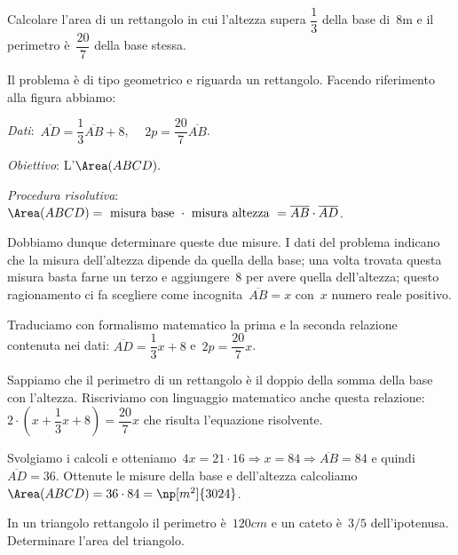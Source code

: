 \begin{problema}
 Calcolare l'area di un rettangolo in cui
l'altezza supera $\dfrac{1}{3}$ della base di~8m e il
perimetro è~$\dfrac{20}{7}$ della base stessa.
\end{problema}

\begin{soluzione}
 Il problema è di tipo geometrico e riguarda un rettangolo. Facendo riferimento alla figura abbiamo:
\begin{multicols}{2}
 \emph{Dati}:~$\overline{AD}=\dfrac{1}{3}\overline{AB}+8$, $\quad 2p=\dfrac{20}{7}\overline{AB}$.

\emph{Obiettivo}: L'$\Area (ABCD).$

\begin{center}
 
\end{center}
\end{multicols}

\emph{Procedura risolutiva}:
$\Area (ABCD)=\text{ misura base }\cdot \text{ misura altezza }=\overline{AB}\cdot \overline{AD}$.

Dobbiamo dunque determinare queste due misure. I dati del problema
indicano che la misura dell'altezza dipende da quella
della base; una volta trovata questa misura basta farne un terzo e
aggiungere~8 per avere quella dell'altezza; questo
ragionamento ci fa scegliere come incognita~$\overline{AB}=x$
con~$x$ numero reale positivo.

Traduciamo con formalismo matematico la prima e la seconda relazione
contenuta nei dati:
$\overline{AD}=\dfrac{1}{3}x+8$ e~$2p=\dfrac{20}{7}x$.

Sappiamo che il perimetro di un rettangolo è il doppio della somma
della base con l'altezza. Riscriviamo con linguaggio
matematico anche questa relazione:~$2\cdot \left(x+\dfrac{1}{3}x+8\right)=\dfrac{20}{7}x$
che risulta l'equazione risolvente.

Svolgiamo i calcoli e otteniamo~$4x=21\cdot 16\Rightarrow x=84\Rightarrow\overline{AB}=84$ e quindi~$\overline{AD}=36$.
Ottenute le misure della base e dell'altezza calcoliamo~$\Area (ABCD)=36\cdot 84=\np[m^2]{3024}$.
\end{soluzione}

\begin{problema}
In un triangolo rettangolo il perimetro è~$120\unit{cm}$ e un cateto è~$3/5$
dell'ipotenusa. Determinare l'area del
triangolo.
\end{problema}


